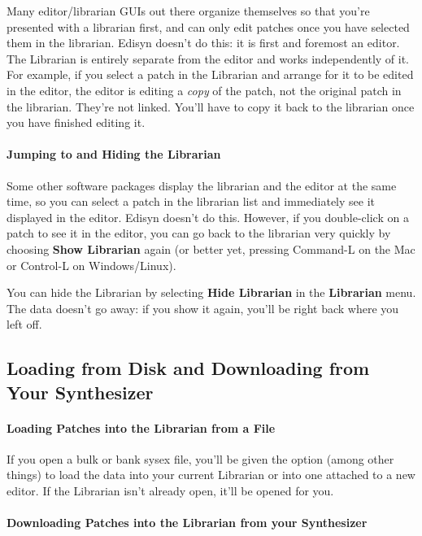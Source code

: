 \documentclass{article}
\begin{document}
Many editor/librarian GUIs out there organize themselves so that you're presented with a librarian first, and can only edit patches once you have selected them in the librarian.  Edisyn doesn't do this: it is first and foremost an editor.  The Librarian is entirely separate from the editor and works independently of it.  For example, if you select a patch in the Librarian and arrange for it to be edited in the editor, the editor is editing a {\it copy} of the patch, not the original patch in the librarian. They're not linked.  You'll have to copy it back to the librarian once you have finished editing it.

\paragraph{Jumping to and Hiding the Librarian}
 
Some other software packages display the librarian and the editor at the same time, so you can select a patch in the librarian list and immediately see it displayed in the editor.  Edisyn doesn't do this.  However, if you double-click on a patch to see it in the editor, you can go back to the librarian very quickly by choosing {\bf Show Librarian} again (or better yet, pressing Command-L on the Mac or Control-L on Windows/Linux).

You can hide the Librarian by selecting {\bf Hide Librarian} in the {\bf Librarian} menu.  The data doesn't go away: if you show it again, you'll be right back where you left off.


\subsection{Loading from Disk and Downloading from Your Synthesizer} 

\paragraph{Loading Patches into the Librarian from a File}

If you open a bulk or bank sysex file, you'll be given the option (among other things) to load the data into your current Librarian or into one attached to a new editor.  If the Librarian isn't already open, it'll be opened for you.

\paragraph{Downloading Patches into the Librarian from your Synthesizer}
\end{document}
